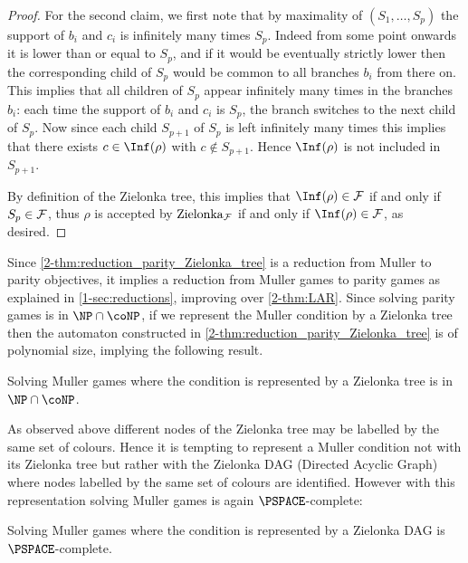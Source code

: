 \begin{proof}
For the second claim, we first note that by maximality of $(S_1,\dots,S_p)$ the support of $b_i$ and $c_i$ is infinitely many times $S_p$.
Indeed from some point onwards it is lower than or equal to $S_p$, and if it would be eventually strictly lower then the corresponding child of $S_p$ would be common to all branches $b_i$ from there on.
This implies that all children of $S_p$ appear infinitely many times in the branches $b_i$: each time the support of $b_i$ and $c_i$ is $S_p$, the branch switches to the next child of $S_p$.
Now since each child $S_{p+1}$ of $S_p$ is left infinitely many times this implies that there exists $c \in \Inf(\rho)$ with $c \notin S_{p+1}$.
Hence $\Inf(\rho)$ is not included in $S_{p+1}$.

By definition of the Zielonka tree, this implies that $\Inf(\rho) \in \F$ if and only if $S_p \in \mathcal{F}$,
thus $\rho$ is accepted by $\mathrm{Zielonka}_{\mathcal{F}}$ if and only if $\Inf(\rho) \in \F$, as desired.
\end{proof}

Since \cref{2-thm:reduction_parity_Zielonka_tree} is a reduction from Muller to parity objectives,
it implies a reduction from Muller games to parity games as explained in \cref{1-sec:reductions},
improving over \cref{2-thm:LAR}. 
Since solving parity games is in $\NP \cap \coNP$,
if we represent the Muller condition by a Zielonka tree then the automaton constructed in \cref{2-thm:reduction_parity_Zielonka_tree}
is of polynomial size, implying the following result.

\begin{theorem}
\label{2-thm:complexity_Muller_games_representation_Zielonka_tree}
Solving Muller games where the condition is represented by a Zielonka tree is in $\NP \cap \coNP$.
\end{theorem}

As observed above different nodes of the Zielonka tree may be labelled by the same set of colours.
Hence it is tempting to represent a Muller condition not with its Zielonka tree but rather with the Zielonka DAG (Directed Acyclic Graph)
where nodes labelled by the same set of colours are identified.
However with this representation solving Muller games is again $\PSPACE$-complete:

\begin{theorem}
\label{2-thm:Muller_games_DAG}
Solving Muller games where the condition is represented by a Zielonka DAG is $\PSPACE$-complete.
\end{theorem}

